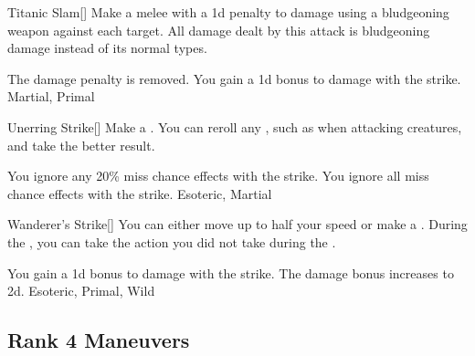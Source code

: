 \lowercase{\hypertarget{maneuver:Titanic Slam}{}}\label{maneuver:Titanic Slam}
\hypertarget{maneuver:Titanic Slam}{}
\begin{freeability}[Rank 3]{Titanic Slam}[]
Make a melee  with a \minus1d penalty to damage using a bludgeoning weapon against each target.
All damage dealt by this attack is bludgeoning damage instead of its normal types.

\rankline
{} The damage penalty is removed.
 You gain a \plus1d bonus to damage with the strike.
 Martial, Primal
\end{freeability}
\vspace{0.25em}



\lowercase{\hypertarget{maneuver:Unerring Strike}{}}\label{maneuver:Unerring Strike}
\hypertarget{maneuver:Unerring Strike}{}
\begin{freeability}[Rank 3]{Unerring Strike}[]
Make a .
You can reroll any , such as when attacking  creatures, and take the better result.

\rankline
{} You ignore any 20\% miss chance effects with the strike.
 You ignore all miss chance effects with the strike.
 Esoteric, Martial
\end{freeability}
\vspace{0.25em}



\lowercase{\hypertarget{maneuver:Wanderer's Strike}{}}\label{maneuver:Wanderer's Strike}
\hypertarget{maneuver:Wanderer's Strike}{}
\begin{freeability}[Rank 3]{Wanderer's Strike}[]
You can either move up to half your speed or make a .
During the , you can take the action you did not take during the .

\rankline
{} You gain a \plus1d bonus to damage with the strike.
 The damage bonus increases to \plus2d.
 Esoteric, Primal, Wild
\end{freeability}
\vspace{0.25em}


\subsection{Rank 4 Maneuvers}

